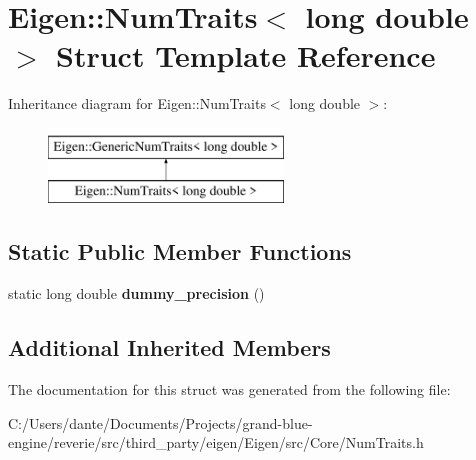 \hypertarget{struct_eigen_1_1_num_traits_3_01long_01double_01_4}{}\section{Eigen\+::Num\+Traits$<$ long double $>$ Struct Template Reference}
\label{struct_eigen_1_1_num_traits_3_01long_01double_01_4}
Inheritance diagram for Eigen\+::Num\+Traits$<$ long double $>$\+:\begin{figure}[H]
\begin{center}
\leavevmode
\includegraphics[height=2.000000cm]{struct_eigen_1_1_num_traits_3_01long_01double_01_4}
\end{center}
\end{figure}
\subsection*{Static Public Member Functions}
\begin{DoxyCompactItemize}
\item 
\mbox{\label{struct_eigen_1_1_num_traits_3_01long_01double_01_4_a5bf85ab5ecced7609defe19263af11f4}} 
static long double {\bfseries dummy\+\_\+precision} ()
\end{DoxyCompactItemize}
\subsection*{Additional Inherited Members}


The documentation for this struct was generated from the following file\+:\begin{DoxyCompactItemize}
\item 
C\+:/\+Users/dante/\+Documents/\+Projects/grand-\/blue-\/engine/reverie/src/third\+\_\+party/eigen/\+Eigen/src/\+Core/Num\+Traits.\+h\end{DoxyCompactItemize}
